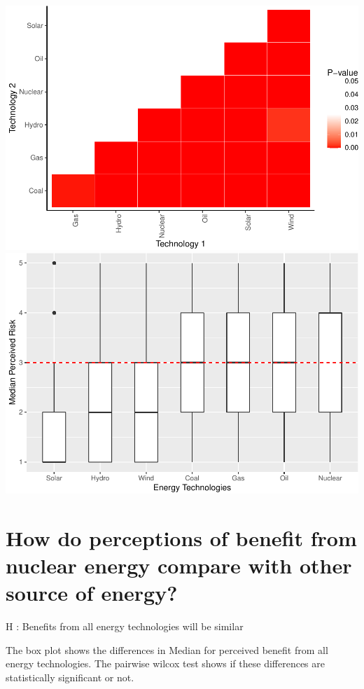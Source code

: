 \documentclass[
]{article}
\begin{document}
\includegraphics{Significant_results_files/figure-latex/unnamed-chunk-10-1.pdf}
\includegraphics{Significant_results_files/figure-latex/unnamed-chunk-10-2.pdf}

\newpage

\hypertarget{how-do-perceptions-of-benefit-from-nuclear-energy-compare-with-other-source-of-energy}{%
\section{How do perceptions of benefit from nuclear energy compare with
other source of
energy?}\label{how-do-perceptions-of-benefit-from-nuclear-energy-compare-with-other-source-of-energy}}

H : Benefits from all energy technologies will be similar

The box plot shows the differences in Median for perceived benefit from
all energy technologies. The pairwise wilcox test shows if these
differences are statistically significant or not.
\end{document}
